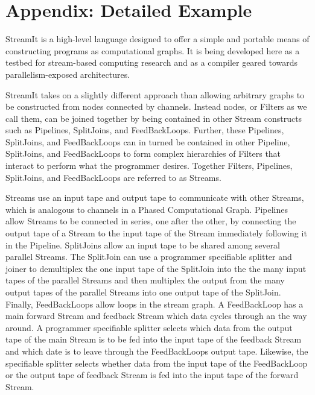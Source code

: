 \section{Appendix: Detailed Example}
StreamIt is a high-level language designed to offer a simple and portable means of constructing programs as computational graphs. It is being developed here as a testbed for stream-based computing research and as a compiler geared towards parallelism-exposed architectures.

StreamIt takes on a slightly different approach than allowing arbitrary graphs to be constructed from nodes connected by channels. Instead nodes, or Filters as we call them, can be joined together by being contained in other Stream constructs such as Pipelines, SplitJoins, and FeedBackLoops. Further, these Pipelines, SplitJoins, and FeedBackLoops can in turned be contained in other Pipeline, SplitJoins, and FeedBackLoops to form complex hierarchies of Filters that interact to perform what the programmer desires. Together Filters, Pipelines, SplitJoins, and FeedBackLoops are referred to as Streams.

Streams use an input tape and output tape to communicate with other Streams, which is analogous to channels in a Phased Computational Graph. Pipelines allow Streams to be connected in series, one after the other, by connecting the output tape of a Stream to the input tape of the Stream immediately following it in the Pipeline. SplitJoins allow an input tape to be shared among several parallel Streams. The SplitJoin can use a programmer specifiable splitter and joiner to demultiplex the one input tape of the SplitJoin into the the many input tapes of the parallel Streams and then multiplex the output from the many output tapes of the parallel Streams into one output tape of the SplitJoin. Finally, FeedBackLoops allow loops in the stream graph. A FeedBackLoop has a main forward Stream and feedback Stream which data cycles through an the way around. A programmer specifiable splitter selects which data from the output tape of the main Stream is to be fed into the input tape of the feedback Stream and which date is to leave through the FeedBackLoops output tape. Likewise, the specifiable splitter selects whether data from the input tape of the FeedBackLoop or the output tape of feedback Stream is fed into the input tape of the forward Stream.


